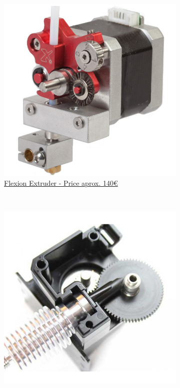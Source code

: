 \documentclass[11pt,a4paper]{article}
\begin{document}
\begin{figure}[H]
    \centering
    ~ %
    \begin{subfigure}[b]{0.4\textwidth}
        \includegraphics[width=\textwidth,cfbox=azul_marcos 4pt 0pt]{FOTOS/EXTRUSOR7}
		\caption*{\href{https://flexionextruder.com/}{{\footnotesize Flexion Extruder - Price aprox. 140\euro}}}
    \end{subfigure}
    ~ \qquad %
    \begin{subfigure}[b]{0.4\textwidth}
        \includegraphics[width=\textwidth,cfbox=azul_marcos 4pt 0pt]{FOTOS/EXTRUSOR8}

\end{subfigure}
\end{figure}
\end{document}

